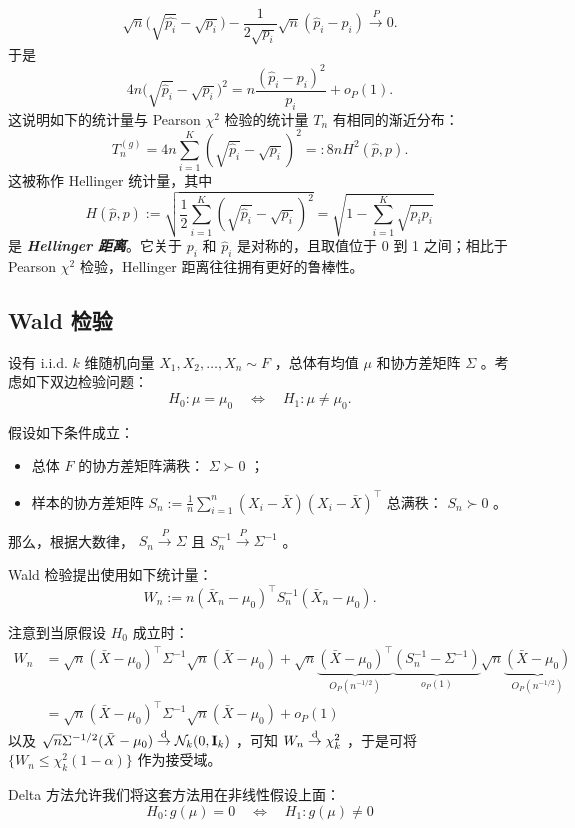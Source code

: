 \[
\sqrt n\big(\sqrt{\widehat{p_i}}-\sqrt{p_i}\big)
-\frac1{2\sqrt{p_i}}\sqrt n(\widehat p_i-p_i)
\overset{P}\to 0.
\]
于是
\[
4n\big(\sqrt{\widehat p_i}-\sqrt{p_i}\big)^2
=n\frac{(\widehat p_i-p_i)^2}{p_i}+o_P(1).
\]
这说明如下的统计量与 Pearson $\chi^2$ 检验的统计量 $T_n$ 有相同的渐近分布：
\[
T^{(g)}_n
=4n\sum_{i=1}^K(\sqrt{\widehat p_i}-\sqrt{p_i})^2
=:8nH^2(\widehat p,p).
\]
这被称作 Hellinger 统计量，其中
\[
H(\widehat p,p)
:=\sqrt{\frac12\sum_{i=1}^K(\sqrt{\widehat{p}_i}-\sqrt{p_i})^2}
=\sqrt{1-\sum_{i=1}^K\sqrt{\widehat{p}_ip_i}}
\]
是 \emph{\textbf{Hellinger 距离}}。它关于 $p_i$ 和 $\widehat p_i$ 是对称的，且取值位于 0 到 1 之间；相比于 Pearson $\chi^2$ 检验，Hellinger 距离往往拥有更好的鲁棒性。

\subsection{Wald 检验}\label{ex:ch5:wald-test}
 

\begin{example}[Wald 检验]
设有 i.i.d. $k$ 维随机向量 $X_1,X_2,\dots,X_n\sim F$ ，总体有均值 $\mu$ 和协方差矩阵 $\Sigma$ 。考虑如下双边检验问题：
\[
H_0:\mu=\mu_0\quad \iff \quad H_1:\mu\ne \mu_0.
\]

假设如下条件成立：

\begin{itemize}
\tightlist
\item
  总体 $F$ 的协方差矩阵满秩： $\Sigma\succ 0$ ；
\item
  样本的协方差矩阵 $S_n:=\frac1n\sum_{i=1}^n(X_i-\bar{X})(X_i-\bar{X})^\top$ 总满秩： $S_n\succ 0$ 。
\end{itemize}

那么，根据大数律， $S_n\overset{P}\to \Sigma$ 且 $S_n^{-1}\overset P\to \Sigma^{-1}$ 。

Wald 检验提出使用如下统计量：
\[
W_n:=n(\bar X_n-\mu_0)^\top S_n^{-1}(\bar{X}_n-\mu_0).
\]

注意到当原假设 $H_0$ 成立时：
\[\begin{aligned} W_n &= \sqrt{n}(\bar{X}-\mu_0)^\top \Sigma^{-1} \sqrt{n}(\bar{X}-\mu_0)  + \sqrt{n}\underbrace{(\bar{X}-\mu_0)^\top}_{O_P(n^{-1/2})}\underbrace{ (S_n^{-1}-\Sigma^{-1}) }_{o_P(1)}\sqrt{n}\underbrace{(\bar{X}-\mu_0) }_{O_P(n^{-1/2})}\\ &= \sqrt{n}(\bar{X}-\mu_0)^\top \Sigma^{-1} \sqrt{n}(\bar{X}-\mu_0)  +  o_P(1) \end{aligned}\]
以及 $\sqrt n\Sigma^{-1/2}(\bar{X}-\mu_0)\overset{\rm d}\to\mathcal N_k(0,\mathbf I_k)$ ，可知 $W_n\overset{\rm d}\to \chi_k^2$ ，于是可将 $\{W_n\le \chi^2_k(1-\alpha)\}$ 作为接受域。
\end{example}
Delta 方法允许我们将这套方法用在非线性假设上面： 
$$H_0:g(\mu)=0\quad \iff \quad H_1:g(\mu)\ne 0$$

